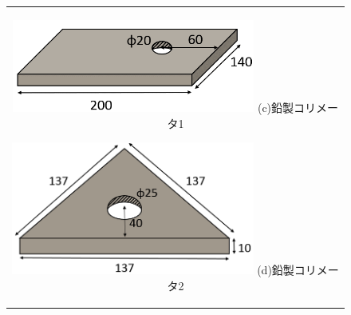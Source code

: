 \begin{figure}[H]
	\begin{center}
		\begin{tabular}{c}
			\begin{minipage}{0.5\hsize}
				\begin{center}
					\includegraphics[width=80mm]{fig/isb/leadcollimator1.png}
					\hspace{1.6cm} (c)鉛製コリメータ1
				\end{center}
			\end{minipage}
			\begin{minipage}{0.5\hsize}
				\begin{center}
					\includegraphics[width=80mm]{fig/isb/leadcollimator2.png}
					\hspace{1.6cm} (d)鉛製コリメータ2
				\end{center}
			\end{minipage}
		\end{tabular}
	\end{center}
\end{figure}

\newpage
